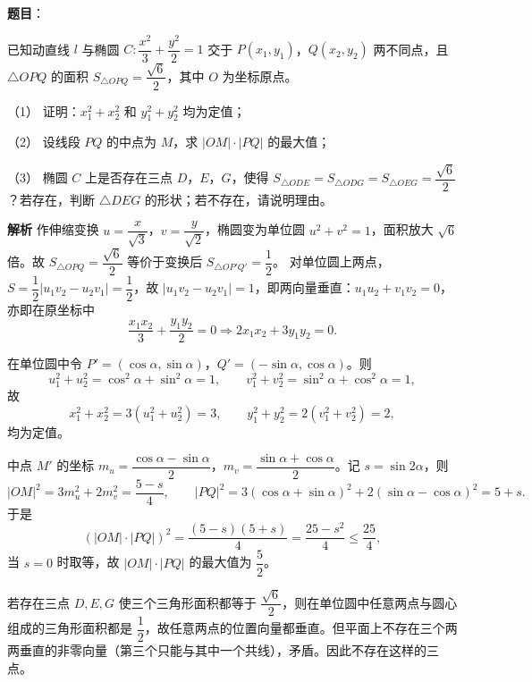 \begin{answer}

\textbf{题目}：

已知动直线 $l$ 与椭圆 $C:\dfrac{x^2}{3}+\dfrac{y^2}{2}=1$ 交于 $P(x_1,y_1)$，$Q(x_2,y_2)$ 两不同点，且 $\triangle OPQ$ 的面积 $S_{\triangle OPQ}=\dfrac{\sqrt6}{2}$，其中 $O$ 为坐标原点。

（1） 证明：$x_1^2+x_2^2$ 和 $y_1^2+y_2^2$ 均为定值；

（2） 设线段 $PQ$ 的中点为 $M$，求 $|OM|\cdot|PQ|$ 的最大值；

（3） 椭圆 $C$ 上是否存在三点 $D$，$E$，$G$，使得 $S_{\triangle ODE}=S_{\triangle ODG}=S_{\triangle OEG}=\dfrac{\sqrt6}{2}$？若存在，判断 $\triangle DEG$ 的形状；若不存在，请说明理由。

\textbf{解析}
作伸缩变换 $u=\dfrac{x}{\sqrt3}$，$v=\dfrac{y}{\sqrt2}$，椭圆变为单位圆 $u^2+v^2=1$，面积放大 $\sqrt6$ 倍。故 $S_{\triangle OPQ}=\dfrac{\sqrt6}2$ 等价于变换后 $S_{\triangle OP'Q'}=\dfrac12$。
对单位圆上两点，$S=\dfrac12|u_1v_2-u_2v_1|=\dfrac12$，故 $|u_1v_2-u_2v_1|=1$，即两向量垂直：$u_1u_2+v_1v_2=0$，亦即在原坐标中
\nopagebreak[4]
\[\frac{x_1x_2}{3}+\frac{y_1y_2}{2}=0\Longrightarrow 2x_1x_2+3y_1y_2=0.\]

在单位圆中令 $P'=(\cos\alpha,\sin\alpha)$，$Q'=(-\sin\alpha,\cos\alpha)$。则
\nopagebreak[4]
\[u_1^2+u_2^2=\cos^2\alpha+\sin^2\alpha=1,\qquad v_1^2+v_2^2=\sin^2\alpha+\cos^2\alpha=1,\]
故
\nopagebreak[4]
\[x_1^2+x_2^2=3(u_1^2+u_2^2)=3,\qquad y_1^2+y_2^2=2(v_1^2+v_2^2)=2,\]
均为定值。

中点 $M'$ 的坐标 $m_u=\dfrac{\cos\alpha-\sin\alpha}{2}$，$m_v=\dfrac{\sin\alpha+\cos\alpha}{2}$。记 $s=\sin2\alpha$，则
\nopagebreak[4]
\[|OM|^2=3m_u^2+2m_v^2=\frac{5-s}{4},\qquad |PQ|^2=3(\cos\alpha+\sin\alpha)^2+2(\sin\alpha-\cos\alpha)^2=5+s.\]
于是
\nopagebreak[4]
\[(|OM|\cdot|PQ|)^2=\frac{(5-s)(5+s)}4=\frac{25-s^2}{4}\leqslant\frac{25}4,\]
当 $s=0$ 时取等，故 $|OM|\cdot|PQ|$ 的最大值为 $\dfrac52$。

若存在三点 $D,E,G$ 使三个三角形面积都等于 $\dfrac{\sqrt6}2$，则在单位圆中任意两点与圆心组成的三角形面积都是 $\dfrac12$，故任意两点的位置向量都垂直。但平面上不存在三个两两垂直的非零向量（第三个只能与其中一个共线），矛盾。因此不存在这样的三点。




\end{answer}